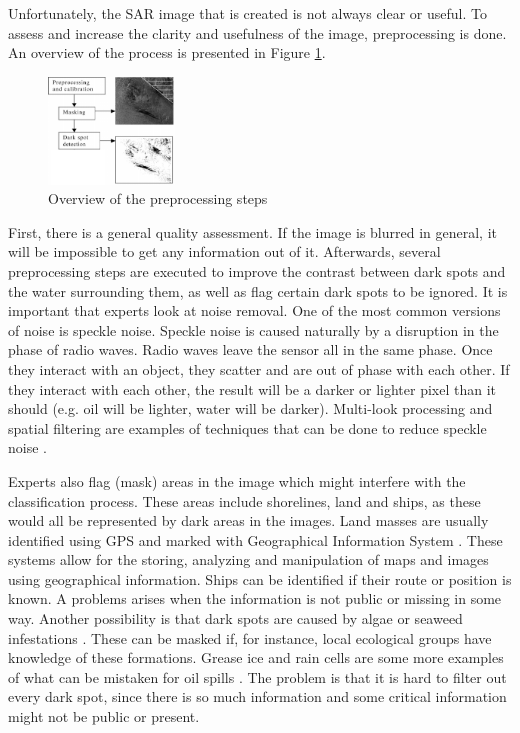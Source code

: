 Unfortunately, the SAR image that is created is not always clear or useful. To assess and increase the clarity and usefulness of the image, preprocessing is done. An overview of the process is presented in Figure \ref{fig:overview}.

\begin{figure}[H]
	\centering
    \includegraphics[width=0.3\textwidth]{./img/preprocessing_diagram.png}
    \caption{\footnotesize{Overview of the preprocessing steps \cite{Solberg200745}}}
    \label{fig:overview}
\end{figure}

First, there is a general quality assessment. If the image is blurred in general, it will be impossible to get any information out of it.
Afterwards, several preprocessing steps are executed to improve the contrast between dark spots and the water surrounding them, as well as flag certain dark spots to be ignored. 
It is important that experts look at noise removal. One of the most common versions of noise is speckle noise. Speckle noise is caused naturally by a disruption in the phase of radio waves. Radio waves leave the sensor all in the same phase. Once they interact with an object, they scatter and are out of phase with each other. If they interact with each other, the result will be a darker or lighter pixel than it should (e.g. oil will be lighter, water will be darker). Multi-look processing and spatial filtering are examples of techniques that can be done to reduce speckle noise \cite{simard1998analysis}.

Experts also flag (mask) areas in the image which might interfere with the classification process. These areas include shorelines, land and ships, as these would all be represented by dark areas in the images. Land masses are usually identified using GPS and marked with Geographical Information System \cite{star1990geographic}. These systems allow for the storing, analyzing and manipulation of maps and images using geographical information. Ships can be identified if their route or position is known. A problems arises when the information is not public or missing in some way.
Another possibility is that dark spots are caused by algae or seaweed infestations \cite{fingas2014review}. These can be masked if, for instance, local ecological groups have knowledge of these formations. Grease ice and rain cells are some more examples of what can be mistaken for oil spills \cite{Brekke200595}. The problem is that it is hard to filter out every dark spot, since there is so much information and some critical information might not be public or present.


